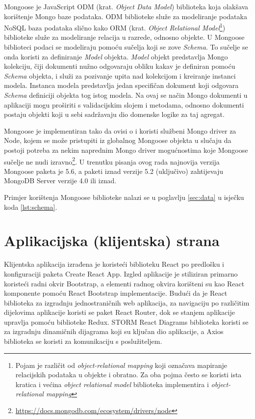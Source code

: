 \documentclass[times, utf8, diplomski, numeric]{fer}
\begin{document}
Mongoose je JavaScript ODM (krat. \emph{Object Data Model}) biblioteka koja olakšava korištenje Mongo baze podataka.
ODM biblioteke služe za modeliranje podataka NoSQL baza podataka slično kako ORM (krat. \emph{Object Relational Model}\footnote{
    Pojam je različit od \emph{object-relational mapping} koji označava mapiranje relacijskih podataka u objekte i obratno. Za oba pojma često se koristi ista kratica i većina \emph{object relational model} biblioteka implementira i \emph{object-relational mapping}
}) biblioteke služe za modeliranje relacija u razrede, odnosno objekte. U Mongoose biblioteci podaci se modeliraju pomoću sučelja koji se zove \emph{Schema}.
To sučelje se onda koristi za definiranje \emph{Model} objekta.
\emph{Model} objekt predstavlja Mongo kolekciju, čiji dokumenti nužno odgovaraju obliku kakav je definiran pomoću \emph{Schema} objekta, i služi za pozivanje upita nad kolekcijom i kreiranje instanci modela.
Instanca modela predstavlja jedan specifičan dokument koji odgovara \emph{Schema} definiciji objekta tog istog modela.
Na ovaj se način Mongo dokumenti u aplikaciji mogu proširiti s validacijskim slojem i metodama, odnosno dokumenti postaju objekti koji u sebi sadržavaju dio domenske logike za taj agregat\citep{mongoose}.

Mongoose je implementiran tako da ovisi o i koristi službeni Mongo driver za Node, kojem se može pristupiti iz globalnog Mongoose objekta u slučaju da postoji potreba za nekim naprednim Mongo driver mogućnostima koje Mongoose sučelje ne nudi izravno\footnote{\url{https://docs.mongodb.com/ecosystem/drivers/node}}.
U trenutku pisanja ovog rada najnovija verzija Mongoose paketa je 5.6, a paketi iznad verzije 5.2 (uključivo) zahtijevaju MongoDB Server verzije 4.0 ili iznad.

Primjer korištenja Mongoose biblioteke nalazi se u poglavlju \ref{sec:data} u isječku koda \ref{lst:schema}.


\newpage
\section{Aplikacijska (klijentska) strana}

Klijentska aplikacija izrađena je koristeći biblioteku React po predlošku i konfiguraciji paketa Create React App.
Izgled aplikacije je stiliziran primarno koristeći radni okvir  Bootstrap, a elementi radnog okvira korišteni su kao React komponente pomoću React Bootstrap implementacije.
Budući da je React biblioteka za izgradnju jednostraničnih  web aplikacija, za navigaciju po različitim dijelovima aplikacije koristi se paket React Router, dok se stanjem aplikacije upravlja pomoću biblioteke Redux.
STORM React Diagrams biblioteka koristi se za izgradnju dinamičnih dijagrama koji su ključan dio aplikacije, a Axios biblioteka se koristi za komunikaciju s poslužiteljem.
\end{document}
